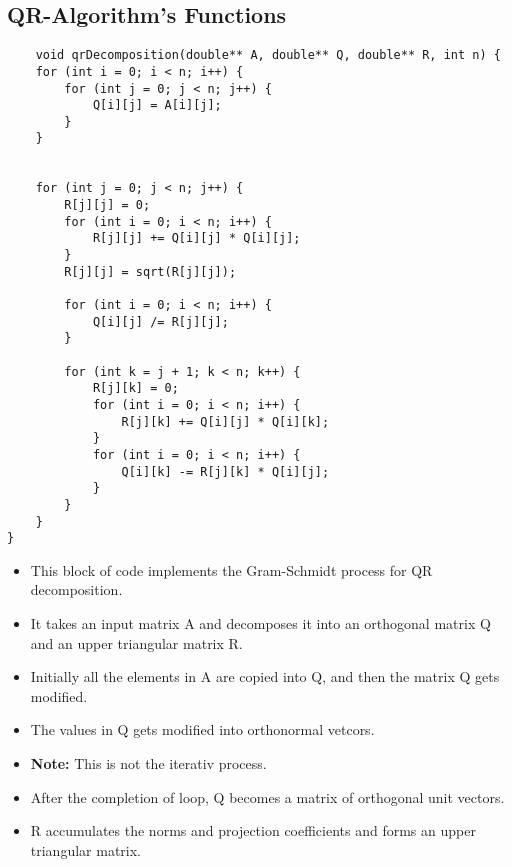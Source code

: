 \documentclass{article}
\begin{document}
\subsection{QR-Algorithm's Functions}
\begin{lstlisting}
    void qrDecomposition(double** A, double** Q, double** R, int n) {
    for (int i = 0; i < n; i++) {
        for (int j = 0; j < n; j++) {
            Q[i][j] = A[i][j];
        }
    }


    for (int j = 0; j < n; j++) {
        R[j][j] = 0;
        for (int i = 0; i < n; i++) {
            R[j][j] += Q[i][j] * Q[i][j];
        }
        R[j][j] = sqrt(R[j][j]);
        
        for (int i = 0; i < n; i++) {
            Q[i][j] /= R[j][j];
        }
        
        for (int k = j + 1; k < n; k++) {
            R[j][k] = 0;
            for (int i = 0; i < n; i++) {
                R[j][k] += Q[i][j] * Q[i][k];
            }
            for (int i = 0; i < n; i++) {
                Q[i][k] -= R[j][k] * Q[i][j];
            }
        }
    }
}
\end{lstlisting}
\begin{itemize}
\item This block of code implements the Gram-Schmidt process for QR decomposition.
\item It takes an input matrix A and decomposes it into an orthogonal matrix Q and an upper triangular matrix R.
\item Initially all the elements in A are copied into Q, and then the matrix Q gets modified.
\item The values in Q gets modified into orthonormal vetcors.
\item \textbf{Note:} This is not the iterativ process.
\item After the completion of loop, Q becomes a matrix of orthogonal unit vectors.
\item  R accumulates the norms and projection coefficients and forms an upper triangular matrix.
\end{itemize}
\end{document}
